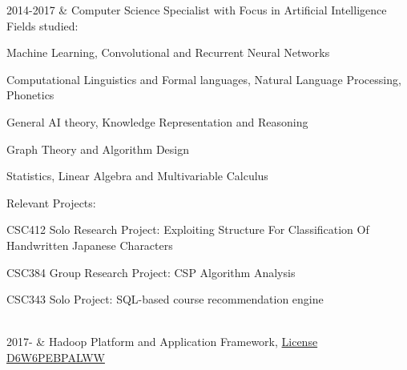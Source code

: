\documentclass[]{cv-roald}
\begin{document}
\begin{tabularcv}
    2014-2017   &   
                    \newline Computer Science Specialist with Focus in Artificial Intelligence
                    \newline Fields studied:
                    \begin{tabitemize}
                        \item Machine Learning, Convolutional and Recurrent Neural Networks
                        \item Computational Linguistics and Formal languages, Natural Language Processing, Phonetics
                        \item General AI theory, Knowledge Representation and Reasoning 
                        \item Graph Theory and Algorithm Design
                        \item Statistics, Linear Algebra and Multivariable Calculus\newline
                    \end{tabitemize}
                    Relevant Projects:
                    \begin{tabitemize}
                        \item CSC412 Solo Research Project: Exploiting Structure For Classification Of Handwritten Japanese Characters
                        \item CSC384 Group Research Project: CSP Algorithm Analysis
                        \item CSC343 Solo Project: SQL-based course recommendation engine
                    \end{tabitemize}
                    \\[\vspacepar] %
                    
    2017-       &   
                    \newline Hadoop Platform and Application Framework, \href{https://www.coursera.org/account/accomplishments/verify/D6W6PEBPALWW}{License D6W6PEBPALWW}
\end{tabularcv}
\end{document}
